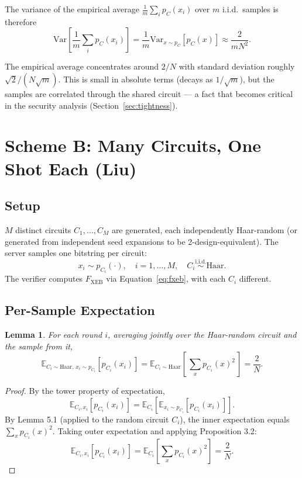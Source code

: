 \documentclass[11pt]{article}
\theoremstyle{plain}
\newtheorem{lemma}[theorem]{Lemma}
\theoremstyle{definition}
\newcommand{\Fxeb}{F_{\text{XEB}}}
\newcommand{\E}{\mathbb{E}}
\newcommand{\Var}{\mathrm{Var}}
\begin{document}
The variance of the empirical average $\frac{1}{m}\sum_i p_C(x_i)$ over $m$ i.i.d.\ samples is therefore
\begin{equation}
\Var\!\left[\frac{1}{m}\sum_i p_C(x_i)\right] = \frac{1}{m} \Var_{x \sim p_C}[p_C(x)] \approx \frac{2}{mN^2}.
\label{eq:scheme-a-mean-var}
\end{equation}

\begin{intuition}
The empirical average concentrates around $2/N$ with standard deviation roughly $\sqrt{2}/(N\sqrt{m})$. This is small in absolute terms (decays as $1/\sqrt{m}$), but the samples are correlated through the shared circuit --- a fact that becomes critical in the security analysis (Section~\ref{sec:tightness}).
\end{intuition}

\section{Scheme B: Many Circuits, One Shot Each (Liu)}

\subsection{Setup}

$M$ distinct circuits $C_1, \ldots, C_M$ are generated, each independently Haar-random (or generated from independent seed expansions to be 2-design-equivalent). The server samples one bitstring per circuit:
\[
x_i \sim p_{C_i}(\cdot), \quad i = 1, \ldots, M, \quad C_i \overset{\text{i.i.d.}}{\sim} \text{Haar}.
\]
The verifier computes $\Fxeb$ via Equation~\eqref{eq:fxeb}, with each $C_i$ different.

\subsection{Per-Sample Expectation}

\begin{lemma}
For each round $i$, averaging jointly over the Haar-random circuit and the sample from it,
\begin{equation}
\E_{C_i \sim \text{Haar},\, x_i \sim p_{C_i}}[p_{C_i}(x_i)] = \E_{C_i \sim \text{Haar}}\!\left[\,\sum_x p_{C_i}(x)^2\,\right] = \frac{2}{N}.
\label{eq:scheme-b-per-sample}
\end{equation}
\end{lemma}

\begin{proof}
By the tower property of expectation,
\[
\E_{C_i, x_i}[p_{C_i}(x_i)] = \E_{C_i}\!\left[\E_{x_i \sim p_{C_i}}[p_{C_i}(x_i)]\right].
\]
By Lemma 5.1 (applied to the random circuit $C_i$), the inner expectation equals $\sum_x p_{C_i}(x)^2$. Taking outer expectation and applying Proposition 3.2:
\[
\E_{C_i, x_i}[p_{C_i}(x_i)] = \E_{C_i}\!\left[\sum_x p_{C_i}(x)^2\right] = \frac{2}{N}.
\]
\end{proof}
\end{document}
